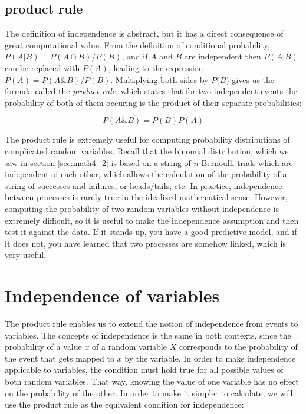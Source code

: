 \documentclass[
  letterpaper,
  DIV=11,
  numbers=noendperiod]{scrreprt}
\begin{document}
\hypertarget{product-rule}{%
\subsection{product rule}\label{product-rule}}

The definition of independence is abstract, but it has a direct
consequence of great computational value. From the definition of
conditional probability, \(P(A|B) = P(A\cap B)/P(B)\), and if \(A\) and
\(B\) are independent then \(P(A|B)\) can be replaced with \(P(A)\),
leading to the expression \(P(A) = P(A\& B)/P(B)\). Multiplying both
sides by \(P(B\)) gives us the formula called the \emph{product rule},
which states that for two independent events the probability of both of
them occuring is the product of their separate probabilities:

\[
P(A \& B) = P(B)P(A)
\]

The product rule is extremely useful for computing probability
distributions of complicated random variables. Recall that the binomial
distribution, which we saw in section \ref{sec:math4_2} is based on a
string of \(n\) Bernoulli trials which are independent of each other,
which allows the calculation of the probability of a string of successes
and failures, or heads/tails, etc. In practice, independence between
processes is rarely true in the idealized mathematical sense. However,
computing the probability of two random variables without independence
is extremely difficult, so it is useful to make the independence
assumption and then test it against the data. If it stands up, you have
a good predictive model, and if it does not, you have learned that two
processes are somehow linked, which is very useful.

\hypertarget{independence-of-variables}{%
\section{Independence of variables}\label{independence-of-variables}}

The product rule enables us to extend the notion of independence from
events to variables. The concepts of independence is the same in both
contexts, since the probability of a value \(x\) of a random variable
\(X\) corresponds to the probability of the event that gets mapped to
\(x\) by the variable. In order to make independence applicable to
variables, the condition must hold true for all possible values of both
random variables. That way, knowing the value of one variable has no
effect on the probability of the other. In order to make it simpler to
calculate, we will use the product rule as the equivalent condition for
independence:
\end{document}

